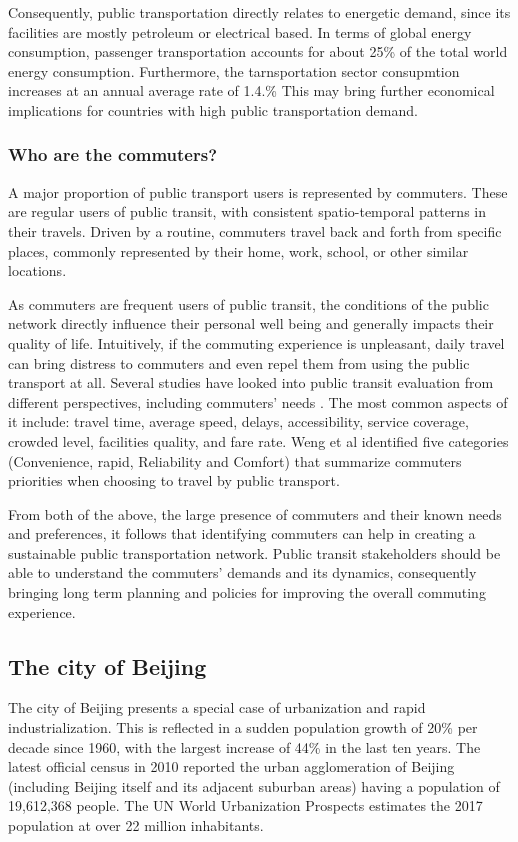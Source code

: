 \documentclass{article}
\begin{document}
Consequently, public transportation directly relates to energetic demand, since its facilities are mostly petroleum or electrical based. In terms of global energy consumption, passenger transportation accounts for about 25\% of the total world energy consumption. Furthermore, the tarnsportation sector consupmtion increases at an annual average rate of 1.4.\% \cite{eia2016energy} This may bring further economical implications for countries with high public transportation demand.

\subsubsection{Who are the commuters?}
A major proportion of public transport users is represented by commuters. These are regular users of public transit, with consistent spatio-temporal patterns in their travels. Driven by a routine, commuters travel back and forth from specific places, commonly represented by their home, work, school, or other similar locations.

As commuters are frequent users of public transit, the  conditions of the public network directly influence their personal well being and generally impacts their quality of life. Intuitively, if the commuting experience is unpleasant, daily travel can bring distress to commuters and even repel them from using the public transport at all. Several studies have looked into public transit evaluation from different perspectives, including commuters' needs \cite{mao2016commuting}. The most common aspects of it include: travel time, average speed, delays, accessibility, service coverage, crowded level, facilities quality, and fare rate. Weng et al \cite{weng2013bus} identified five categories (Convenience, rapid, Reliability and Comfort) that summarize commuters priorities when choosing to travel by public transport.
 
From both of the above, the large presence of commuters and their known needs and preferences, it follows that identifying commuters can help in creating a sustainable public transportation network. Public transit stakeholders should be able to understand the commuters' demands and its dynamics, consequently bringing long term planning and policies for improving the overall commuting experience.

\subsection{The city of Beijing}
The city of Beijing presents a special case of urbanization and rapid industrialization. This is reflected in a sudden population growth of 20\% per decade since 1960, with the largest increase of 44\% in the last ten years. The latest official census in 2010 reported the urban agglomeration of Beijing (including Beijing itself and its adjacent suburban areas) having a population of 19,612,368 people. The UN World Urbanization Prospects estimates the 2017 population at over 22 million inhabitants. \cite{world2016beijing}
\end{document}
